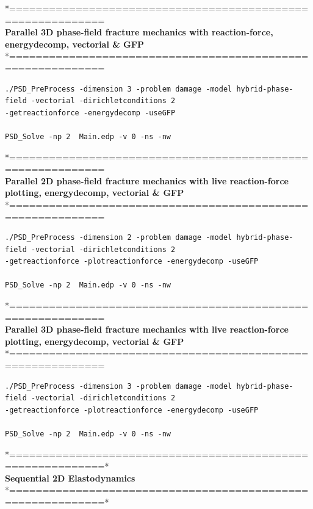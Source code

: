 \documentclass{report}
\begin{document}
*============================================================\\
\textbf{ Parallel 3D phase-field fracture mechanics with reaction-force, energydecomp, vectorial \& GFP} \\
*============================================================\\
\begin{lstlisting}[style=Linux]
./PSD_PreProcess -dimension 3 -problem damage -model hybrid-phase-field -vectorial -dirichletconditions 2 
-getreactionforce -energydecomp -useGFP   

PSD_Solve -np 2  Main.edp -v 0 -ns -nw   	
\end{lstlisting}
*============================================================\\
 \textbf{Parallel 2D phase-field fracture mechanics with live reaction-force plotting, energydecomp, vectorial \& GFP} \\
*============================================================\\
\begin{lstlisting}[style=Linux]
./PSD_PreProcess -dimension 2 -problem damage -model hybrid-phase-field -vectorial -dirichletconditions 2 
-getreactionforce -plotreactionforce -energydecomp -useGFP  

PSD_Solve -np 2  Main.edp -v 0 -ns -nw   
\end{lstlisting}
*============================================================\\
\textbf{ Parallel 3D phase-field fracture mechanics with live reaction-force plotting, energydecomp, vectorial \& GFP} \\
*============================================================\\
\begin{lstlisting}[style=Linux]
./PSD_PreProcess -dimension 3 -problem damage -model hybrid-phase-field -vectorial -dirichletconditions 2 
-getreactionforce -plotreactionforce -energydecomp -useGFP   

PSD_Solve -np 2  Main.edp -v 0 -ns -nw   	
\end{lstlisting}


*============================================================*\\
\textbf{ Sequential 2D Elastodynamics}  \\                    
*============================================================*\\
\end{document}
